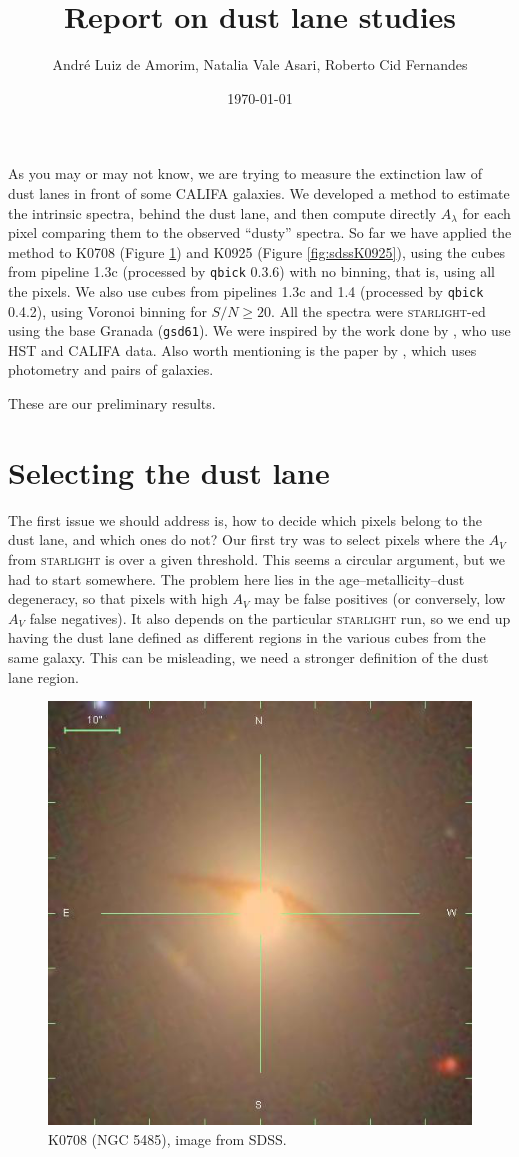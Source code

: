 \documentclass[a4paper]{article}
\author{André Luiz de Amorim, Natalia Vale Asari, Roberto Cid Fernandes}
\date{\today}
\title{Report on dust lane studies}
\def\starlight{\textsc{starlight}\xspace}
\def\qbick{\texttt{qbick}\xspace}
\def\gsd{\texttt{gsd61}\xspace}
\begin{document}
\maketitle

As you may or may not know, we are trying to measure the extinction law of dust
lanes in front of some CALIFA galaxies. We developed a method to estimate the
intrinsic spectra, behind the dust lane, and then compute directly $A_\lambda$
for each pixel comparing them to the observed ``dusty'' spectra. So far we have
applied the method to K0708 (Figure \ref{fig:sdssK0708}) and K0925 (Figure
\ref{fig:sdssK0925}), using the cubes from pipeline 1.3c (processed by \qbick
0.3.6) with no binning, that is, using all the pixels. We also use cubes from
pipelines 1.3c and 1.4 (processed by \qbick 0.4.2), using Voronoi binning for
$S/N \geq 20$. All the spectra were \starlight-ed using the base Granada (\gsd).
We were inspired by the work done by \citet{Holwerda2013}, who use HST and
CALIFA data. Also worth mentioning is the paper by \citet{Wild2011}, which uses
photometry and pairs of galaxies.

These are our preliminary results.


\section{Selecting the dust lane}

The first issue we should address is, how to decide which pixels belong to the
dust lane, and which ones do not? Our first try was to select pixels where the
$A_V$ from \starlight is over a given threshold. This seems a circular argument,
but we had to start somewhere. The problem here lies in the
age--metallicity--dust degeneracy, so that pixels with high $A_V$ may be false
positives (or conversely, low $A_V$ false negatives). It also depends on the
particular \starlight run, so we end up having the dust lane defined as
different regions in the various cubes from the same galaxy. This can be
misleading, we need a stronger definition of the dust lane region.

\begin{figure}
\begin{center}
\includegraphics[width=0.6\columnwidth]{figures/K0708.png}
\end{center}

\caption{K0708 (NGC 5485), image from SDSS.}
\label{fig:sdssK0708}
\end{figure}
\end{document}
